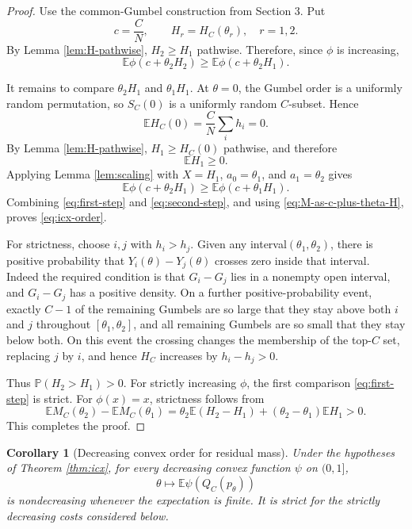 \documentclass[11pt]{article}
\newtheorem{corollary}[theorem]{Corollary}
\newcommand{\E}{\mathbb E}
\newcommand{\Pbb}{\mathbb P}
\newcommand{\1}{\mathbf 1}
\begin{document}
\begin{proof}
Use the common-Gumbel construction from Section 3.  Put
\[
        c=\frac CN,
        \qquad
        H_r=H_C(\theta_r),\quad r=1,2.
\]
By Lemma \ref{lem:H-pathwise}, $H_2\ge H_1$ pathwise.  Therefore, since $\phi$ is
increasing,
\begin{equation}\label{eq:first-step}
        \E\phi(c+\theta_2H_2)
        \ge
        \E\phi(c+\theta_2H_1).
\end{equation}

It remains to compare $\theta_2H_1$ and $\theta_1H_1$.  At $\theta=0$, the Gumbel order
is a uniformly random permutation, so $S_C(0)$ is a uniformly random $C$-subset.  Hence
\[
        \E H_C(0)=\frac CN\sum_i h_i=0.
\]
By Lemma \ref{lem:H-pathwise}, $H_1\ge H_C(0)$ pathwise, and therefore
\[
        \E H_1\ge0.
\]
Applying Lemma \ref{lem:scaling} with $X=H_1$, $a_0=\theta_1$, and $a_1=\theta_2$ gives
\begin{equation}\label{eq:second-step}
        \E\phi(c+\theta_2H_1)
        \ge
        \E\phi(c+\theta_1H_1).
\end{equation}
Combining \eqref{eq:first-step} and \eqref{eq:second-step}, and using
\eqref{eq:M-as-c-plus-theta-H}, proves \eqref{eq:icx-order}.

For strictness, choose $i,j$ with $h_i>h_j$.  Given any interval$(\theta_1,\theta_2)$, there is positive probability that $Y_i(\theta)-Y_j(\theta)$
crosses zero inside that interval.  Indeed the required condition is that
$G_i-G_j$ lies in a nonempty open interval, and $G_i-G_j$ has a positive density.  On a
further positive-probability event, exactly $C-1$ of the remaining Gumbels are so large
that they stay above both $i$ and $j$ throughout $[\theta_1,\theta_2]$, and all remaining
Gumbels are so small that they stay below both.  On this event the crossing changes the
membership of the top-$C$ set, replacing $j$ by $i$, and hence $H_C$ increases by
$h_i-h_j>0$.

Thus $\Pbb(H_2>H_1)>0$.  For strictly increasing $\phi$, the first comparison
\eqref{eq:first-step} is strict.  For $\phi(x)=x$, strictness follows from
\[
        \E M_C(\theta_2)-\E M_C(\theta_1)
        =\theta_2\E(H_2-H_1)+(\theta_2-\theta_1)\E H_1>0.
\]
This completes the proof.
\end{proof}

\begin{corollary}[Decreasing convex order for residual mass]\label{cor:dcx}
Under the hypotheses of Theorem \ref{thm:icx}, for every decreasing convex function
$\psi$ on $(0,1]$,
\begin{equation}\label{eq:decreasing-convex}
        \theta\mapsto \E\psi(Q_C(p_\theta))
\end{equation}
is nondecreasing whenever the expectation is finite.  It is strict for the strictly
decreasing costs considered below.
\end{corollary}
\end{document}
